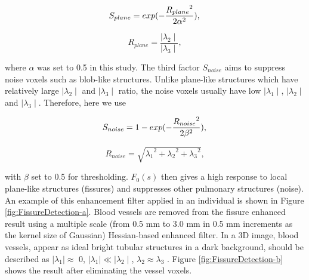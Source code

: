 \documentclass[]{spie}  %
\begin{document}
{\begin{equation}
\label{eq:FissureHessian3}
S_{plane} = exp(-\frac{{R_{plane}}^2}{2\alpha^2}), \\
\end{equation}

\begin{equation}
\label{eq:FissureHessian4}
R_{plane} = \frac{\mid\lambda_{2}\mid}{\mid\lambda_{3}\mid},
\end{equation}

\noindent where $\alpha$ was set to 0.5 in this study. The third factor $S_{noise}$ aims to suppress noise voxels such as blob-like structures. Unlike plane-like structures which have relatively large $\mid\lambda_{2}\mid$ and $\mid\lambda_{3}\mid$ ratio, the noise voxels usually have low $\mid\lambda_{1}\mid$, $\mid\lambda_{2}\mid$ and $\mid\lambda_{3}\mid$. Therefore, here we use

\begin{equation}
\label{eq:FissureHessian5}
S_{noise} = 1 - exp(-\frac{{R_{noise}}^2}{2\beta^2}), \\
\end{equation}

\begin{equation}
\label{eq:FissureHessian6}
R_{noise} = \sqrt{{\lambda_1}^2+{\lambda_2}^2+{\lambda_3}^2},
\end{equation}

\noindent with $\beta$ set to 0.5 for thresholding. $F_0(s)$ then gives a high response to local plane-like structures (fissures) and suppresses other pulmonary structures (noise). An example of this enhancement filter applied in an individual is shown in Figure \ref{fig:FissureDetection-a}. Blood vessels are removed from the fissure enhanced result using a multiple scale (from 0.5 mm to 3.0 mm in 0.5 mm increments as the kernel size of Gaussian) Hessian-based enhanced filter. In a 3D image, blood vessels, appear as ideal bright tubular structures in a dark background, should be described as $\mid\lambda_{1}\mid\approx$ 0, $\mid\lambda_{1}\mid\ll\mid\lambda_{2}\mid$,  $\lambda_{2}\approx\lambda_{3}$ \cite{frangi1998multiscale}. Figure \ref{fig:FissureDetection-b} shows the result after eliminating the vessel voxels.

}
\end{document}
